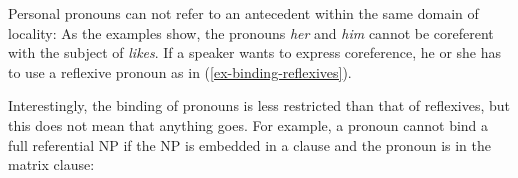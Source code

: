 \documentclass[output=paper
	        ,collection
	        ,collectionchapter
 	        ,biblatex
                ,babelshorthands
                ,newtxmath
                ,draftmode
                ,colorlinks, citecolor=brown
]{langscibook}
\begin{document}
Personal pronouns can not refer to an antecedent within the same domain of locality:
\eal
{}
\zl
As the examples show, the pronouns \emph{her} and \emph{him} cannot be coreferent with the subject
of \emph{likes}. If a speaker wants to express coreference, he or she has to use a reflexive pronoun
as in (\ref{ex-binding-reflexives}). 

Interestingly, the binding of pronouns is less restricted than that of reflexives, but this does
not mean that anything goes. For example, a pronoun cannot bind a full referential NP if the NP is
embedded in a clause and the pronoun is in the matrix clause:
\eal
\label{ex-he-thinks-that-Peter}
\zl  
\end{document}
